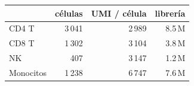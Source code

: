 \begin{tabular}{lrrr}\toprule
 & células & UMI / célula & librería\\\midrule
CD4 T & 3\,041 & 2\,989 & 8.5\,M\\
CD8 T & 1\,302 & 3\,104 & 3.8\,M\\
NK & 407 & 3\,147 & 1.2\,M\\
Monocitos & 1\,238 & 6\,747 & 7.6\,M\\
\bottomrule\end{tabular}

